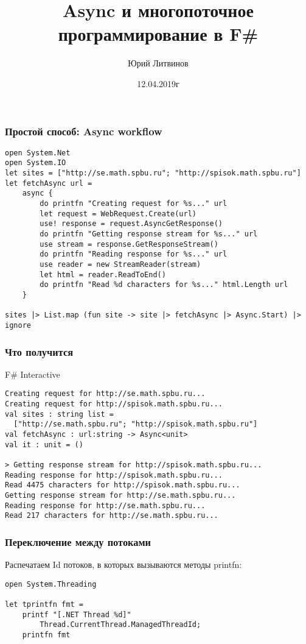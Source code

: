 \documentclass[xetex,mathserif,serif]{beamer}
\title{Async и многопоточное программирование в F\#}
\author{Юрий Литвинов}
\date{12.04.2019г}
\begin{document}
	
	\frame{\titlepage}

	\begin{frame}[fragile]
		\frametitle{Простой способ: Async workflow}
		\begin{footnotesize}
			\begin{verbatim}
open System.Net
open System.IO
let sites = ["http://se.math.spbu.ru"; "http://spisok.math.spbu.ru"]
let fetchAsync url =
    async { 
        do printfn "Creating request for %s..." url
        let request = WebRequest.Create(url)
        use! response = request.AsyncGetResponse()
        do printfn "Getting response stream for %s..." url
        use stream = response.GetResponseStream()
        do printfn "Reading response for %s..." url
        use reader = new StreamReader(stream)
        let html = reader.ReadToEnd()
        do printfn "Read %d characters for %s..." html.Length url 
    }

sites |> List.map (fun site -> site |> fetchAsync |> Async.Start) |> ignore
			\end{verbatim}
		\end{footnotesize}
	\end{frame}

	\begin{frame}[fragile]
		\frametitle{Что получится}
		\begin{alertblock}{F\# Interactive}
			\begin{verbatim}
Creating request for http://se.math.spbu.ru...
Creating request for http://spisok.math.spbu.ru...
val sites : string list =
  ["http://se.math.spbu.ru"; "http://spisok.math.spbu.ru"]
val fetchAsync : url:string -> Async<unit>
val it : unit = ()

> Getting response stream for http://spisok.math.spbu.ru...
Reading response for http://spisok.math.spbu.ru...
Read 4475 characters for http://spisok.math.spbu.ru...
Getting response stream for http://se.math.spbu.ru...
Reading response for http://se.math.spbu.ru...
Read 217 characters for http://se.math.spbu.ru...
			\end{verbatim}
		\end{alertblock}
	\end{frame}

	\begin{frame}[fragile]
		\frametitle{Переключение между потоками}
		Распечатаем Id потоков, в которых вызываются методы printfn:
		\begin{verbatim}
open System.Threading

let tprintfn fmt =
    printf "[.NET Thread %d]"   
        Thread.CurrentThread.ManagedThreadId;
    printfn fmt
		\end{verbatim}
	\end{frame}
\end{document}
